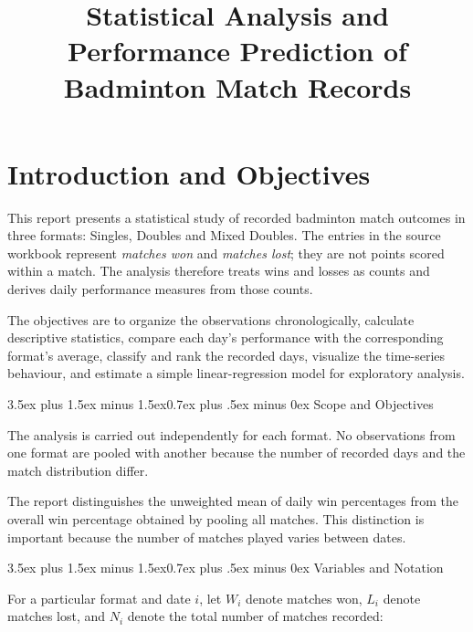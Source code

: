 \documentclass[journal]{IEEEtran}
\title{Statistical Analysis and Performance Prediction of
Badminton Match Records}
\author{}
\date{}
\makeatletter
\renewcommand\subsection{\@startsection{subsection}{2}{\z@}%
  {3.5ex plus 1.5ex minus 1.5ex}{0.7ex plus .5ex minus 0ex}%
  {\normalfont\normalsize\bfseries\upshape\color{red}}}
\numberwithin{equation}{subsection}
\makeatother
\begin{document}

\onecolumn

\tableofcontents
\newpage
\listoffigures
\newpage
\listoftables
\newpage

\section{Introduction and Objectives}

This report presents a statistical study of recorded badminton
match outcomes in three formats: Singles, Doubles and Mixed
Doubles. The entries in the source workbook represent
\textit{matches won} and \textit{matches lost}; they are not
points scored within a match. The analysis therefore treats
wins and losses as counts and derives daily performance
measures from those counts.

The objectives are to organize the observations chronologically,
calculate descriptive statistics, compare each day's performance
with the corresponding format's average, classify and rank the
recorded days, visualize the time-series behaviour, and estimate
a simple linear-regression model for exploratory analysis.

\subsection{Scope and Objectives}

The analysis is carried out independently for each format.
No observations from one format are pooled with another because
the number of recorded days and the match distribution differ.

The report distinguishes the unweighted mean of daily win
percentages from the overall win percentage obtained by pooling
all matches. This distinction is important because the number
of matches played varies between dates.

\subsection{Variables and Notation}

For a particular format and date \(i\), let \(W_i\) denote
matches won, \(L_i\) denote matches lost, and \(N_i\) denote
the total number of matches recorded:
\end{document}
